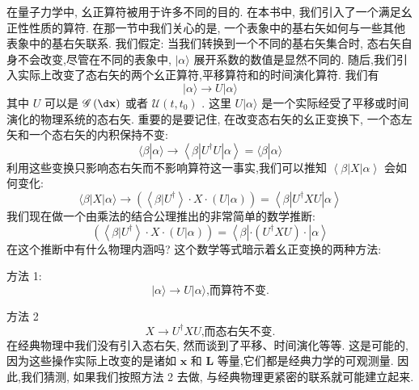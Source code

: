 在量子力学中, 幺正算符被用于许多不同的目的. 在本书中, 我们引入了一个满足幺正性性质的算符. 在那一节中我们关心的是, 一个表象中的基右矢如何与一些其他表象中的基右矢联系. 我们假定: 当我们转换到一个不同的基右矢集合时, 态右矢自身不会改变,尽管在不同的表象中, $|\alpha \rangle$ 展开系数的数值是显然不同的. 随后,我们引入实际上改变了态右矢的两个幺正算符,平移算符和的时间演化算符. 我们有
\begin{equation}
	\left| {\alpha \rangle \rightarrow U}\right| \alpha \rangle
\end{equation}
其中 $U$ 可以是 $\mathscr{G}\left( {\d\mathbf{x}}\right)$ 或者 $\mathcal{U}\left( {t,{t}_{0}}\right)$ . 这里 $U | \alpha \rangle$ 是一个实际经受了平移或时间演化的物理系统的态右矢.
重要的是要记住, 在改变态右矢的幺正变换下, 一个态左矢和一个态右矢的内积保持不变:
\begin{equation}
	\langle \beta | \alpha \rangle \rightarrow \left\langle {\beta \left| {{U}^{ \dagger }U}\right| \alpha }\right\rangle = \langle \beta | \alpha \rangle
\end{equation}
利用这些变换只影响态右矢而不影响算符这一事实,我们可以推知 $\left\langle {\beta \left| X\right| \alpha }\right\rangle$ 会如何变化:
\begin{equation}
	\langle \beta \left| X\right| \alpha \rangle \rightarrow \left( {\left\langle {\beta | {U}^{ \dagger }}\right\rangle \cdot X \cdot \left( {U | \alpha }\right) }\right) = \left\langle {\beta \left| {{U}^{ \dagger }{XU}}\right| \alpha }\right\rangle
\end{equation}
我们现在做一个由乘法的结合公理推出的非常简单的数学推断:
\begin{equation}
	\left( {\left\langle {\beta | {U}^{ \dagger }}\right\rangle \cdot X \cdot \left( {U | \alpha }\right) }\right) = \left\langle {\beta \left| {\cdot \left( {{U}^{ \dagger }{XU}}\right) \cdot }\right| \alpha }\right\rangle
\end{equation}
在这个推断中有什么物理内涵吗? 这个数学等式暗示着幺正变换的两种方法:

方法 1:
\begin{equation}
	\left| {\alpha \rangle \rightarrow U}\right| \alpha \rangle \text{,而算符不变.}
\end{equation}

方法 2
\begin{equation}
	X \rightarrow {U}^{ \dagger }{XU}\text{,而态右矢不变.}
\end{equation}
在经典物理中我们没有引入态右矢, 然而谈到了平移、时间演化等等. 这是可能的, 因为这些操作实际上改变的是诸如 $\mathbf{x}$ 和 $\mathbf{L}$ 等量,它们都是经典力学的可观测量. 因此,我们猜测, 如果我们按照方法 2 去做, 与经典物理更紧密的联系就可能建立起来.

